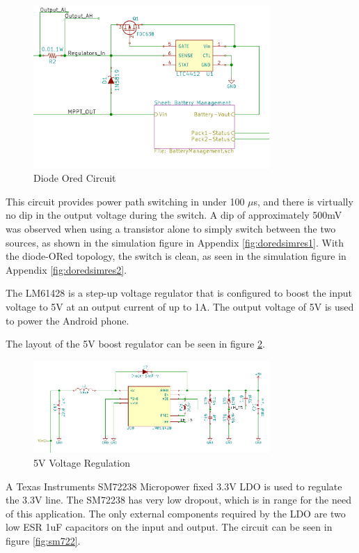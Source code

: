 \documentclass{article}
\numberwithin{figure}{section}
\numberwithin{equation}{section}
\begin{document}
{\begin{figure}[H]
	\centering
	\includegraphics[width=0.8\textwidth]{DiodeOR}
	\caption{Diode Ored Circuit}
	\label{fig:dored}
\end{figure}

This circuit provides power path switching in under 100 $\mu$s, and there is virtually no dip in the output voltage during the switch. A dip of approximately 500mV was observed when using a transistor alone to simply switch between the two sources, as shown in the simulation figure in Appendix \ref{fig:doredsimres1}. With the diode-ORed topology, the switch is clean, as seen in the simulation figure in Appendix \ref{fig:doredsimres2}.

\bigskip
The LM61428 is a step-up voltage regulator that is configured to boost the input voltage to 5V at an output current of up to 1A. The output voltage of 5V is used to power the Android phone.

\bigskip
The layout of the 5V boost regulator can be seen in figure \ref{fig:ps5}.
\begin{figure}[H]
	\centering
	\includegraphics[width=0.8\textwidth]{PS5V}
	\caption{5V Voltage Regulation}
	\label{fig:ps5}
\end{figure}

\bigskip
A Texas Instruments SM72238 Micropower fixed 3.3V LDO is used to regulate the 3.3V line. The SM72238 has very low dropout, which is in range for the need of this application. The only external components required by the LDO are two low ESR 1uF capacitors on the input and output. The circuit can be seen in figure \ref{fig:sm722}.

}
\end{document}
